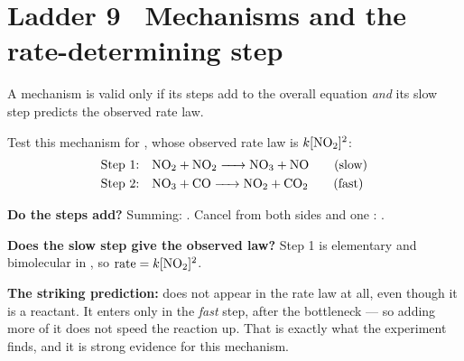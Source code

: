 \documentclass{apchem-worksheet}
\begin{document}
\section*{\sffamily Ladder 9 \textbullet\ Mechanisms and the rate-determining step}
  

A mechanism is valid only if its steps add to the overall equation
\emph{and} its slow step predicts the observed rate law.

\begin{workedexample}
Test this mechanism for , whose observed rate law
is $k[\ce{NO2}]^2$:
\begin{align*}
\text{Step 1:}\quad & \ce{NO2 + NO2 -> NO3 + NO} \qquad \text{(slow)}\\
\text{Step 2:}\quad & \ce{NO3 + CO -> NO2 + CO2} \qquad \text{(fast)}
\end{align*}

\textbf{Do the steps add?} Summing:
. Cancel  from both
sides and one :
. \checkmark

\textbf{Does the slow step give the observed law?} Step 1 is elementary
and bimolecular in , so
$\text{rate} = k[\ce{NO2}]^2$. \checkmark

\textbf{The striking prediction:}  does not appear in the rate law
at all, even though it is a reactant. It enters only in the \emph{fast}
step, after the bottleneck --- so adding more of it does not speed the
reaction up. That is exactly what the experiment finds, and it is strong
evidence for this mechanism.
\end{workedexample}
\end{document}
